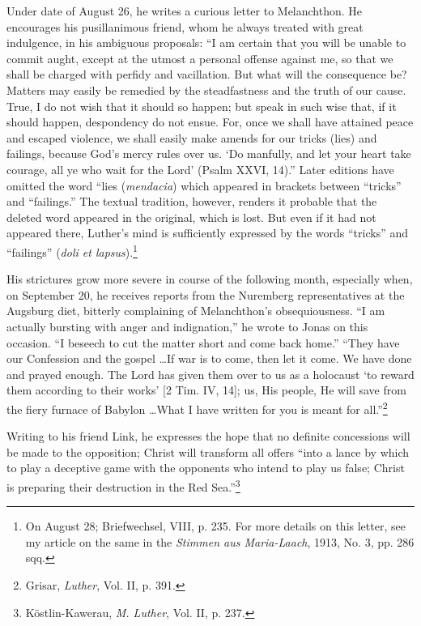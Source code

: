 Under date of August 26, he writes a curious letter to Melanchthon. He
encourages his pusillanimous friend, whom he always treated
with great indulgence, in his ambiguous proposals: “I am certain that
you will be unable to commit aught, except at the utmost a personal
offense against me, so that we shall be charged with perfidy and vacillation.
But what will the consequence be? Matters may easily be
remedied by the steadfastness and the truth of our cause. True, I do
not wish that it should so happen; but speak in such wise that, if it
should happen, despondency do not ensue. For, once we shall have
attained peace and escaped violence, we shall easily make amends for
our tricks (lies) and failings, because God’s mercy rules over us. ‘Do
manfully, and let your heart take courage, all ye who wait for the
Lord’ (Psalm XXVI, 14).” Later editions have omitted the word
“lies (\textit{mendacia}) which appeared in brackets between “tricks” and
“failings.” The textual tradition, however, renders it probable that
the deleted word appeared in the original, which is lost. But even if it
had not appeared there, Luther’s mind is sufficiently expressed by the
words “tricks” and “failings” (\textit{doli et lapsus}).\footnote
{On August 28; Briefwechsel, VIII, p. 235. For more details on this letter, see my
article on the same in the \textit{Stimmen aus Maria-Laach}, 1913, No. 3, pp. 286 sqq.}

His strictures grow more severe in course of the following month,
especially when, on September 20, he receives reports from the
Nuremberg representatives at the Augsburg diet, bitterly complaining
of Melanchthon’s obsequiousness. “I am actually bursting with anger
and indignation,” he wrote to Jonas on this occasion. “I beseech
to cut the matter short and come back home.” “They have our Confession
and the gospel \dots If war is to come, then let it come. We
have done and prayed enough. The Lord has given them over to us
as a holocaust ‘to reward them according to their works’ [2 Tim.
IV, 14]; us, His people, He will save from the fiery furnace of
Babylon \dots What I have written for you is meant for all.”\footnote{Grisar, \textit{Luther}, Vol. II, p. 391.}

Writing to his friend Link, he expresses the hope that no definite
concessions will be made to the opposition; Christ will transform
all offers “into a lance by which to play a deceptive game with the
opponents who intend to play us false; Christ is preparing their destruction
in the Red Sea.”\footnote{Köstlin-Kawerau, \textit{M. Luther}, Vol. II, p. 237.}

